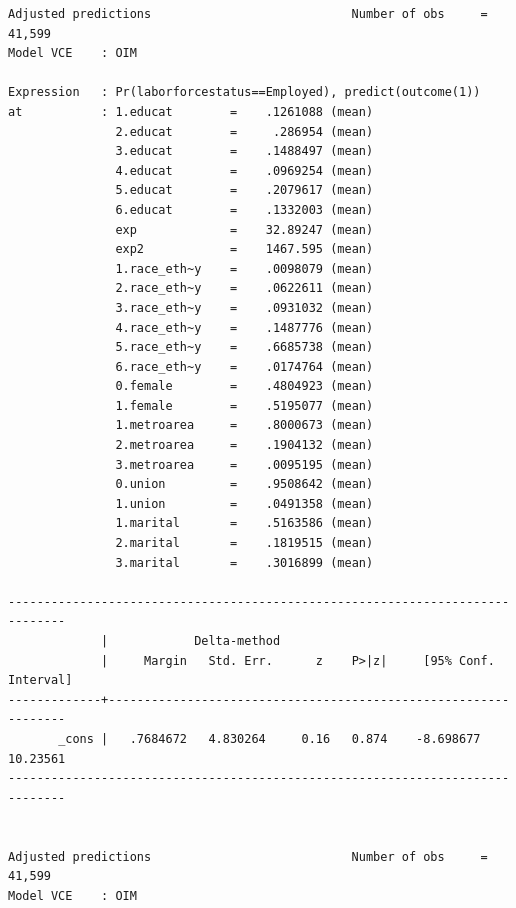 \documentclass[
]{book}
\begin{document}
\begin{verbatim}
Adjusted predictions                            Number of obs     =     41,599
Model VCE    : OIM

Expression   : Pr(laborforcestatus==Employed), predict(outcome(1))
at           : 1.educat        =    .1261088 (mean)
               2.educat        =     .286954 (mean)
               3.educat        =    .1488497 (mean)
               4.educat        =    .0969254 (mean)
               5.educat        =    .2079617 (mean)
               6.educat        =    .1332003 (mean)
               exp             =    32.89247 (mean)
               exp2            =    1467.595 (mean)
               1.race_eth~y    =    .0098079 (mean)
               2.race_eth~y    =    .0622611 (mean)
               3.race_eth~y    =    .0931032 (mean)
               4.race_eth~y    =    .1487776 (mean)
               5.race_eth~y    =    .6685738 (mean)
               6.race_eth~y    =    .0174764 (mean)
               0.female        =    .4804923 (mean)
               1.female        =    .5195077 (mean)
               1.metroarea     =    .8000673 (mean)
               2.metroarea     =    .1904132 (mean)
               3.metroarea     =    .0095195 (mean)
               0.union         =    .9508642 (mean)
               1.union         =    .0491358 (mean)
               1.marital       =    .5163586 (mean)
               2.marital       =    .1819515 (mean)
               3.marital       =    .3016899 (mean)

------------------------------------------------------------------------------
             |            Delta-method
             |     Margin   Std. Err.      z    P>|z|     [95% Conf. Interval]
-------------+----------------------------------------------------------------
       _cons |   .7684672   4.830264     0.16   0.874    -8.698677    10.23561
------------------------------------------------------------------------------


Adjusted predictions                            Number of obs     =     41,599
Model VCE    : OIM


\end{verbatim}
\end{document}
